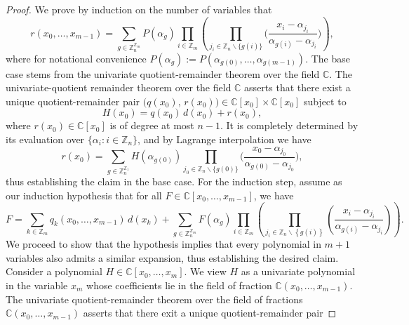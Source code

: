 \begin{proof}
We prove by induction on the number of variables that
\begin{equation}
r(x_{0},\ldots,x_{m-1})=\sum_{g\in\mathbb{Z}_{n}^{\mathbb{Z}_{m}}}P(\alpha_{g})\prod_{i\in\mathbb{Z}_{m}}\left(\prod_{j_{i}\in\mathbb{Z}_{n}\backslash\{g(i)\}}\bigg(\frac{x_{i}-\alpha_{j_{i}}}{\alpha_{g(i)}-\alpha_{j_{i}}}\bigg)\right),
\end{equation}
where for notational convenience $P(\alpha_{g}):=P(\alpha_{g(0)},\ldots,\alpha_{g(m-1)})$.
The base case stems from the univariate quotient-remainder theorem over the field $\mathbb{C}$. The univariate-quotient remainder theorem over the field $\mathbb{C}$ asserts that there exist
a unique quotient-remainder pair $\big(q(x_{0}),\,r(x_{0})\big)\in\mathbb{C}[x_{0}]\times\mathbb{C}[x_{0}]$
subject to
\begin{equation}
H(x_{0})=q(x_{0})\,d(x_{0})+r(x_{0}),
\end{equation}
where $r(x_{0})\in\mathbb{C}[x_{0}]$ is of degree at most $n-1$.
It is completely determined by its evaluation over $\{\alpha_{i}:i\in\mathbb{Z}_{n}\}$,
and by Lagrange interpolation we have 
\begin{equation}
r(x_{0})=\sum_{g\in\mathbb{Z}_{n}^{\mathbb{Z}_{1}}}H(\alpha_{g(0)})\prod_{j_{0}\in\mathbb{Z}_{n}\backslash\{g(0)\}}\bigg(\frac{x_{0}-\alpha_{j_{0}}}{\alpha_{g(0)}-\alpha_{j_{0}}}\bigg),
\end{equation}
thus establishing the claim in the base case. For the induction step,
assume as our induction hypothesis that for all $F\in\mathbb{C}\left[x_{0},\ldots,x_{m-1}\right]$,
we have
\begin{equation}
F=\sum_{k\in\mathbb{Z}_{m}}q_{k}(x_{0},\ldots,x_{m-1})\,d(x_{k})+\sum_{g\in\mathbb{Z}_{n}^{\mathbb{Z}_{m}}}F(\alpha_{g})\prod_{i\in\mathbb{Z}_{m}}\left(\prod_{j_{i}\in\mathbb{Z}_{n}\backslash\left\{ g(i)\right\} }\left(\frac{x_{i}-\alpha_{j_{i}}}{\alpha_{g(i)}-\alpha_{j_{i}}}\right)\right).
\end{equation}
We proceed to show that the hypothesis implies that every polynomial in
$m+1$ variables also admits a similar expansion, thus establishing
the desired claim. Consider a polynomial $H \in \mathbb{C}[x_{0},\ldots,x_{m}]$. We view $H$ as a univariate polynomial in the variable $x_{m}$ whose coefficients lie in the field of fraction $\mathbb{C}(x_{0},\ldots,x_{m-1})$.
The univariate quotient-remainder theorem over the field of fractions $\mathbb{C}(x_{0},\ldots,x_{m-1})$ asserts that
there exit a unique quotient-remainder pair

\end{proof}
